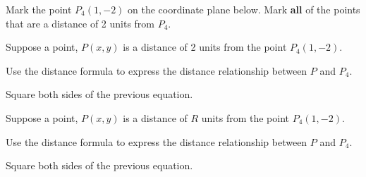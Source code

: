 \begin{problem}
\item Mark the point $P_4(1,-2)$ on the coordinate plane below. Mark \textbf{all}
  of the points that are a distance of 2 units from $P_4$.


  \vfill


\clearpage

\item Suppose a point, $P(x,y)$ is a distance of 2 units from the
  point $P_4(1,-2)$.
  \begin{subproblem}
  \item Use the distance formula to express the distance relationship
    between $P$ and $P_4$.
    \vfill
  \item Square both sides of the previous equation.
    \vfill
  \end{subproblem}

\item Suppose a point, $P(x,y)$ is a distance of $R$ units from the
  point $P_4(1,-2)$.
  \begin{subproblem}
  \item Use the distance formula to express the distance relationship
    between $P$ and $P_4$.
    \vfill
  \item Square both sides of the previous equation.
    \vfill
  \end{subproblem}

\end{problem}


\postClass


